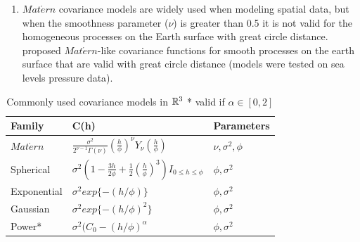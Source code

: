 \begin{enumerate}

\item  $Mat\acute{e}rn$ covariance models are widely used when modeling spatial data, but when the smoothness parameter ($\nu$) is greater than 0.5 it is not valid for the homogeneous processes on the Earth surface with great circle distance. \cite{JeongJun2015} proposed $Mat\acute{e}rn$-like covariance functions for smooth processes on the earth surface that are valid with great circle distance (models were tested on sea levels pressure data).  

\end{enumerate}

\begin{table}[H]
\label{parameters}
\centering
\begin{tabular}{l|l|l}
\hline 
Family & C(h)  & Parameters \\ \hline \hline
$Mat\acute{e}rn$ &  $\frac{\sigma^2}{2^{\nu-1}\Gamma(\nu)} (\frac{h}{\phi})^{\nu} Y_{\nu}(\frac{h}{\phi})$  & $\nu, \sigma^2, \phi$  \\ 

Spherical & $\sigma^2(1-\frac{3h}{2\phi}+\frac{1}{2}(\frac{h}{\phi})^3)I_{0\le h\le \phi}$ & $\phi, \sigma^2$ \\

Exponential & $\sigma^2exp\{-(h/\phi)\}$ & $\phi, \sigma^2$  \\

Gaussian & $\sigma^2exp \{-(h/\phi)^2\}$ & $\phi, \sigma^2$  \\

Power* & $\sigma^2(C_0-(h/\phi)^{\alpha}$ & $\phi, \sigma^2$ \\ \hline
\end{tabular}
\caption{Commonly used covariance models in $\mathbb{R}^3$ * valid if $\alpha\in [0,2]$ }
\end{table}


%